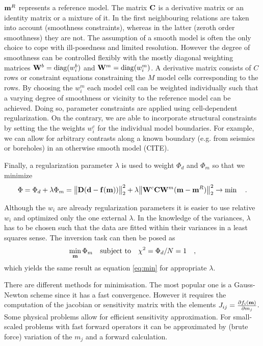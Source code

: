 $\mathbf{m}^R$ represents a reference model.
The matrix $\mathbf{C}$ is a derivative matrix or an identity matrix or a mixture of it.
In the first neighbouring relations are taken into account (smoothness constraints), whereas in the latter (zeroth order smoothness) they are not.
The assumption of a smooth model is often the only choice to cope with ill-posedness and limited resolution.
However the degree of smoothness can be controlled flexibly with the mostly diagonal weighting matrices $\mathbf{W}^b=\operatorname{diag}(w^b_i)$ and $\mathbf{W}^m=\operatorname{diag}(w^m_i)$.
A derivative matrix consists of $C$ rows or constraint equations constraining the $M$ model cells corresponding to the rows.
By choosing the $w^m_i$  each model cell can be weighted individually such that a varying degree of smoothness or vicinity to the reference model can be achieved. 
Doing so, parameter constraints are applied using cell-dependent regularization.
On the contrary, we are able to incorporate structural constraints by setting the the weights $w^c_i$ for the individual model boundaries. 
For example, we can allow for arbitrary contrasts along a known boundary (e.g. from seismics or boreholes) in an otherwise smooth model (CITE).

Finally, a regularization parameter $\lambda$ is used to weight $\Phi_d$ and $\Phi_m$ so that we minimize
\begin{equation}\label{eq:min}
\Phi = \Phi_d + \lambda\Phi_m = \big\Vert \mathbf{D}(\mathbf{d} - \mathbf{f}(\mathbf{m})) \big\Vert^2_2 
+ \lambda \big\Vert\mathbf{W}^c \mathbf{C} \mathbf{W}^m (\mathbf{m}-\mathbf{m}^R)\big\Vert^2_2 \rightarrow \min\quad.
\end{equation}

Although the $w_i$ are already regularization parameters it is easier to use relative $w_i$ and optimized only the one external $\lambda$.
In the knowledge of the variances, $\lambda$ has to be chosen such that the data are fitted within their variances in a least squares sense. The inversion task can then be posed as
\[ \min\limits_{\mathbf{m}} \Phi_m \quad\mbox{subject to}\quad \chi^2=\Phi_d/N=1 \quad, \]
which yields the same result as equation \ref{eq:min} for appropriate $\lambda$.

There are different methods for minimisation.
The most popular one is a Gauss-Newton scheme since it has a fast convergence.
However it requires the computation of the jacobian or sensitivity matrix with the elements $J_{ij}=\frac{\partial f_i(\mathbf{m})}{\partial m_j}$.
Some physical problems allow for efficient sensitivity approximation.
For small-scaled problems with fast forward operators it can be approximated by (brute force) variation of the $m_j$ and a forward calculation.

